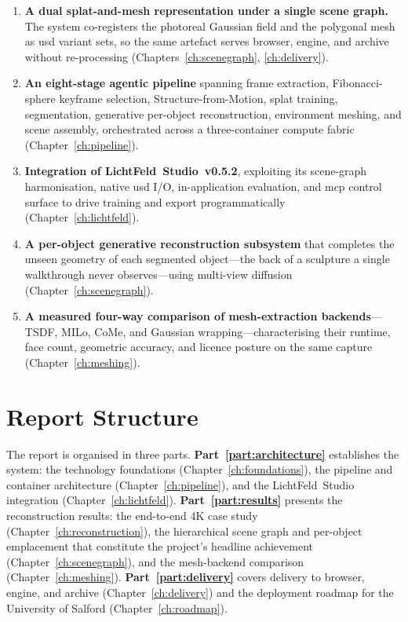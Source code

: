\begin{enumerate}
  \item \textbf{A dual splat-and-mesh representation under a single scene graph.} The system co-registers the photoreal Gaussian field and the polygonal mesh as \acrshort{usd} variant sets, so the same artefact serves browser, engine, and archive without re-processing (Chapters~\ref{ch:scenegraph}, \ref{ch:delivery}).

  \item \textbf{An eight-stage agentic pipeline} spanning frame extraction, Fibonacci-sphere keyframe selection, Structure-from-Motion, splat training, segmentation, generative per-object reconstruction, environment meshing, and scene assembly, orchestrated across a three-container compute fabric (Chapter~\ref{ch:pipeline}).

  \item \textbf{Integration of LichtFeld~Studio~v0.5.2}, exploiting its scene-graph harmonisation, native \acrshort{usd} I/O, in-application evaluation, and \acrshort{mcp} control surface to drive training and export programmatically (Chapter~\ref{ch:lichtfeld}).

  \item \textbf{A per-object generative reconstruction subsystem} that completes the unseen geometry of each segmented object---the back of a sculpture a single walkthrough never observes---using multi-view diffusion (Chapter~\ref{ch:scenegraph}).

  \item \textbf{A measured four-way comparison of mesh-extraction backends}---TSDF, MILo, CoMe, and Gaussian wrapping---characterising their runtime, face count, geometric accuracy, and licence posture on the same capture (Chapter~\ref{ch:meshing}).
\end{enumerate}

\section{Report Structure}
\label{sec:intro-structure}

The report is organised in three parts. \textbf{Part~\ref{part:architecture}} establishes the system: the technology foundations (Chapter~\ref{ch:foundations}), the pipeline and container architecture (Chapter~\ref{ch:pipeline}), and the LichtFeld~Studio integration (Chapter~\ref{ch:lichtfeld}). \textbf{Part~\ref{part:results}} presents the reconstruction results: the end-to-end 4K case study (Chapter~\ref{ch:reconstruction}), the hierarchical scene graph and per-object emplacement that constitute the project's headline achievement (Chapter~\ref{ch:scenegraph}), and the mesh-backend comparison (Chapter~\ref{ch:meshing}). \textbf{Part~\ref{part:delivery}} covers delivery to browser, engine, and archive (Chapter~\ref{ch:delivery}) and the deployment roadmap for the University of Salford (Chapter~\ref{ch:roadmap}).

